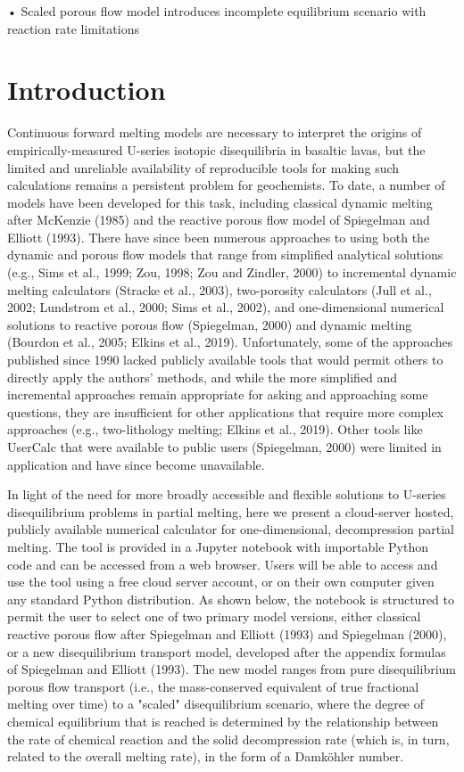 \documentclass[11pt]{article}
\begin{document}
• Scaled porous flow model introduces incomplete equilibrium scenario
with reaction rate limitations



    \hypertarget{introduction}{%
\section{Introduction}\label{introduction}}

Continuous forward melting models are necessary to interpret the origins of empirically-measured U-series isotopic disequilibria in basaltic lavas, but the limited and unreliable availability of reproducible tools for making such calculations remains a persistent problem for geochemists. To date, a number of models have been developed for this task, including classical dynamic melting after McKenzie (1985) and the reactive porous flow model of Spiegelman and Elliott (1993). There have since been numerous approaches to using both the dynamic and porous flow models that range from simplified analytical solutions (e.g., Sims et al., 1999; Zou, 1998; Zou and Zindler, 2000) to incremental dynamic melting calculators (Stracke et al., 2003), two-porosity calculators (Jull et al., 2002; Lundstrom et al., 2000; Sims et al., 2002), and one-dimensional numerical solutions to reactive porous flow (Spiegelman, 2000) and dynamic melting (Bourdon et al., 2005; Elkins et al., 2019). Unfortunately, some of the approaches published since 1990 lacked publicly available tools that would permit others to directly apply the authors’ methods, and while the more simplified and incremental approaches remain appropriate for asking and approaching some questions, they are insufficient for other applications that require more complex approaches (e.g., two-lithology melting; Elkins et al., 2019). Other tools like UserCalc that were available to public users (Spiegelman, 2000) were limited in application and have since become unavailable.

In light of the need for more broadly accessible and flexible solutions to U-series disequilibrium problems in partial melting, here we present a cloud-server hosted, publicly available numerical calculator for one-dimensional, decompression partial melting. The tool is provided in a Jupyter notebook with importable Python code and can be accessed from a web browser. Users will be able to access and use the tool using a free cloud server account, or on their own computer given any standard Python distribution. As shown below, the notebook is structured to permit the user to select one of two primary model versions, either classical reactive porous flow after Spiegelman and Elliott (1993) and Spiegelman (2000), or a new disequilibrium transport model, developed after the appendix formulas of Spiegelman and Elliott (1993). The new model ranges from pure disequilibrium porous flow transport (i.e., the mass-conserved equivalent of true fractional melting over time) to a "scaled" disequilibrium scenario, where the degree of chemical equilibrium that is reached is determined by the relationship between the rate of chemical reaction and the solid decompression rate (which is, in turn, related to the overall melting rate), in the form of a Damköhler number.
\end{document}
